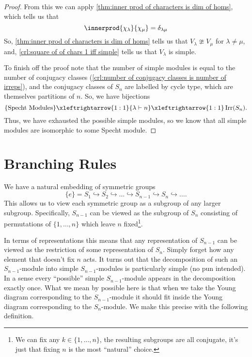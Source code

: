 \documentclass[fleqn]{NotesClass}
\DeclareMathOperator{\Irr}{Irr}
\newcommand{\partition}{\vdash}
\begin{document}
\begin{thm}{}{}
\begin{proof}
            From this we can apply \cref{thm:inner prod of characters is dim of homs}, which tells us that
            \begin{equation}
                \innerprod{\chi_\lambda}{\chi_\mu} = \delta_{\lambda\mu}
            \end{equation}
            So, \cref{thm:inner prod of characters is dim of homs} tells us that \(V_\lambda \ncong V_\mu\) for \(\lambda \ne \mu\), and, \cref{crl:square of of chars 1 iff simple} tells us that \(V_\lambda\) is simple.
            
            To finish off the proof note that the number of simple modules is equal to the number of conjugacy classes (\cref{crl:number of conjugacy classes is number of irreps}), and the conjugacy classes of \(S_n\) are labelled by cycle type, which are themselves partitions of \(n\).
            So, we have bijections
            \begin{equation}
                \{\text{Specht Modules}\} \xleftrightarrow{1:1} \{\lambda \partition n\} \xleftrightarrow{1:1} \Irr(S_n).
            \end{equation}
            Thus, we have exhausted the possible simple modules, so we know that all simple modules are isomorphic to some Specht module.
        \end{proof}
    \end{thm}
    
    \chapter{Branching Rules}
    We have a natural embedding of symmetric groups
    \begin{equation}
        \{e\} = S_1 \hookrightarrow S_2 \hookrightarrow \dotso \hookrightarrow S_{n-1} \hookrightarrow S_n \hookrightarrow \dotso.
    \end{equation}
    This allows us to view each symmetric group as a subgroup of any larger subgroup.
    Specifically, \(S_{n-1}\) can be viewed as the subgroup of \(S_n\) consisting of permutations of \(\{1, \dotsc, n\}\) which leave \(n\) fixed\footnote{We can fix any \(k \in \{1, \dotsc, n\}\), the resulting subgroups are all conjugate, it's just that fixing \(n\) is the most \enquote{natural} choice.}.
    
    In terms of representations this means that any representation of \(S_{n-1}\) can be viewed as the restriction of some representation of \(S_n\).
    Simply forget how any element that doesn't fix \(n\) acts.
    It turns out that the decomposition of such an \(S_{n-1}\)-module into simple \(S_{n-1}\)-modules is particularly simple (no pun intended).
    In a sense every \enquote{possible} simple \(S_{n-1}\)-module appears in the decomposition exactly once.
    What we mean by possible here is that when we take the Young diagram corresponding to the \(S_{n-1}\)-module it should fit inside the Young diagram corresponding to the \(S_n\)-module.
    We make this precise with the following definition.
    
\end{document}
